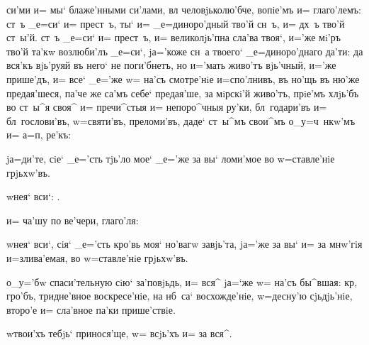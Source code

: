 
 си'ми и= мы` блаже'нными си'лами, вл 
человjьколю'бче, вопiе'мъ и= глаго'лемъ: ст~ъ _е=си` и= 
прест~ъ, ты` и= _е=диноро'дный тво'й сн~ъ, и= дх~ъ тво'й 
ст~ы'й. ст~ъ _е=си` и= прест~ъ, и= великолjь'пна сла'ва 
твоя`, и='же мi'ръ тво'й та'кw возлюби'лъ _е=си`, 
jа='коже сн~а твоего` _е=диноро'днаго да'ти: да вся'къ 
вjь'руяй въ него` не поги'бнетъ, но и='мать живо'тъ 
вjь'чный, и='же прише'дъ, и= все` _е='же w= на'съ 
смотре'нiе и=спо'лнивъ, въ но'щь въ ню'же предая'шеся, 
па'че же са'мъ себе` предая'ше, за мiрскi'й живо'тъ, 
прiе'мъ хлjь'бъ во ст~ы^я своя^ и= пречи^стыя и= 
непоро^чныя ру'ки, бл~годари'въ и= бл~гослови'въ, 
w=святи'въ, преломи'въ, даде` ст~ы^мъ свои^мъ 
о_у=ч~нкw'мъ и= а=п, ре'къ:


 jа=ди'те, сiе` _е='сть тjь'ло мое` _е='же 
за вы` ломи'мое во w=ставле'нiе грjьхw'въ.


 w\т нея` вси`: .

   и= ча'шу по ве'чери, 
глаго'ля:


 w\т нея` вси`, сiя` _е='сть кро'вь моя` но'вагw 
завjь'та, jа='же за вы` и= за мнw'гiя и=злива'емая, во 
w=ставле'нiе грjьхw'въ.



 о_у='бw спаси'тельную сiю` за'повjьдь, и= 
вся^ jа=`же w= на'съ бы^вшая: кр, гро'бъ, тридне'вное 
воскресе'нiе, на нб~са` восхожде'нiе, w=десну'ю 
сjьдjь'нiе, второ'е и= сла'вное па'ки прише'ствiе.

  w\т твои'хъ тебjь` принося'ще, w= 
всjь'хъ и= за вся^.


